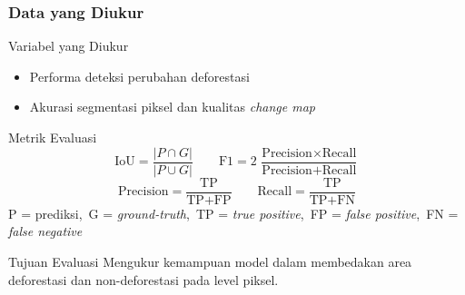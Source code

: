 \documentclass{beamer}
\begin{document}
	\begin{frame}
		\frametitle{Data yang Diukur}
		
		\small
		\begin{block}{Variabel yang Diukur}
			\begin{itemize}
				\item Performa deteksi perubahan deforestasi
				\item Akurasi segmentasi piksel dan kualitas \textit{change map}
			\end{itemize}
		\end{block}
		
		\vspace{0.2cm}
		
		\begin{block}{Metrik Evaluasi}
			\[
			\text{IoU} = \frac{|P \cap G|}{|P \cup G|}
			\qquad
			\text{F1} = 2\,\frac{\text{Precision} \times \text{Recall}}
			{\text{Precision}+\text{Recall}}
			\]
			\[
			\text{Precision} = \frac{\text{TP}}{\text{TP}+\text{FP}}
			\qquad
			\text{Recall} = \frac{\text{TP}}{\text{TP}+\text{FN}}
			\]
			\vspace{0.1cm}
			{\scriptsize P = prediksi,\ G = \textit{ground-truth},\ 
				TP = \textit{true positive},\ FP = \textit{false positive},\ 
				FN = \textit{false negative}}
		\end{block}
		
		\vspace{0.2cm}
		
		\begin{alertblock}{Tujuan Evaluasi}
			\scriptsize
			Mengukur kemampuan model dalam membedakan area
			deforestasi dan non-deforestasi pada level piksel.
		\end{alertblock}
	\end{frame}
	
\end{document}
